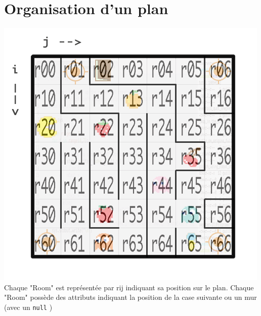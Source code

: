 \documentclass[twoside,french]{report}
\begin{document}
\section{Organisation d'un plan}
   \includegraphics[scale=0.4]{graphics/Plan-Projet-1_numbered.png} \\
   Chaque "Room" est représentée par rij indiquant sa position sur le plan.
   Chaque "Room" possède des attributs indiquant la position de la case suivante ou un mur (avec un \lstinline|null| )
\end{document}
